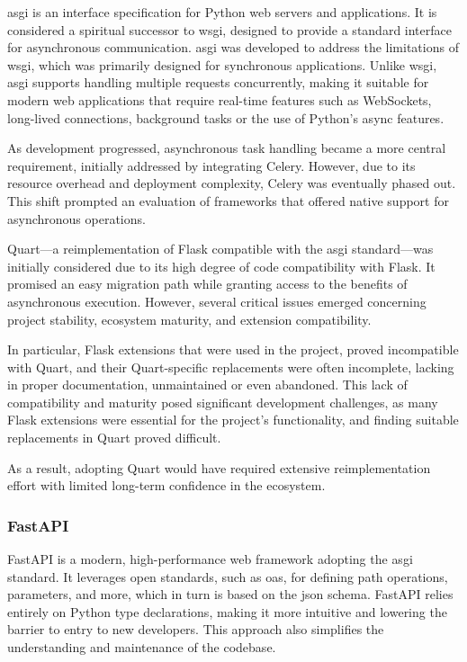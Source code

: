 \ac{asgi} is an interface specification for Python web servers and applications. It is considered a spiritual successor to 
\ac{wsgi}, designed to provide a standard interface for asynchronous communication. \ac{asgi} was developed to address the 
limitations of \ac{wsgi}, which was primarily designed for synchronous applications. Unlike \ac{wsgi}, \ac{asgi} supports 
handling multiple requests concurrently, making it suitable for modern web applications that require real-time features such 
as WebSockets, long-lived connections, background tasks or the use of Python's async features.

As development progressed, asynchronous task handling became a more central requirement, initially addressed by integrating 
Celery. However, due to its resource overhead and deployment complexity, Celery was eventually phased out. This shift 
prompted an evaluation of frameworks that offered native support for asynchronous operations.

Quart—a reimplementation of Flask compatible with the \ac{asgi} standard—was initially considered due to its high degree of 
code compatibility with Flask. It promised an easy migration path while granting access to the benefits of asynchronous 
execution. However, several critical issues emerged concerning project stability, ecosystem maturity, and extension 
compatibility.

In particular, Flask extensions that were used in the project, proved incompatible with Quart, and their Quart-specific 
replacements  were often incomplete, lacking in proper documentation,  unmaintained or even abandoned.
This lack of compatibility and maturity posed significant development challenges, as many Flask extensions were essential
for the project's functionality, and finding suitable replacements in Quart proved difficult.

As a result, adopting Quart would have required extensive reimplementation effort with limited long-term confidence in the 
ecosystem.

\subsubsection{FastAPI}

FastAPI is a modern, high-performance web framework adopting the \ac{asgi} standard. It leverages open standards, such as 
\ac{oas}, for defining path operations, parameters, and more, which in turn is based on the \ac{json} schema.
FastAPI relies entirely on Python type declarations, making it more intuitive and lowering the barrier to entry to new 
developers. This approach also simplifies the understanding and maintenance of the codebase.

